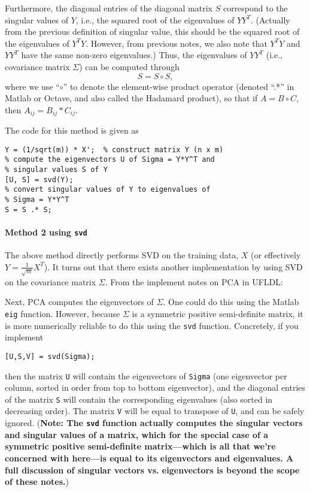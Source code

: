 \documentclass{article}
\begin{document}
Furthermore, the diagonal entries of the diagonal matrix $S$ correspond to the singular values of $Y$, i.e., the squared root of the eigenvalues of $YY^T$. (Actually from the previous definition of singular value, this should be the squared root of the eigenvalues of $Y^TY$. However, from previous notes, we also note that $Y^TY$ and $YY^T$ have the same non-zero eigenvalues.) Thus, the eigenvalues of $YY^T$ (i.e., covariance matrix $\Sigma$) can be computed through
\[
S = S\circ S,
\]
where we use ``$\circ$'' to denote the element-wise product operator (denoted ``.*'' in Matlab or Octave, and also called the Hadamard product), so that if $A=B\circ C$, then $A_{ij}=B_{ij}*C_{ij}$.

The code for this method is given as
\begin{verbatim}
Y = (1/sqrt(m)) * X';  % construct matrix Y (n x m)
% compute the eigenvectors U of Sigma = Y*Y^T and
% singular values S of Y
[U, S] = svd(Y);
% convert singular values of Y to eigenvalues of
% Sigma = Y*Y^T
S = S .* S;
\end{verbatim}

\paragraph{Method 2 using \texttt{svd}} The above method directly performs SVD on the training data, $X$ (or effectively $Y=\frac{1}{\sqrt{m}}X^T$). It turns out that there exists another implementation by using SVD on the covariance matrix $\Sigma$. From the implement notes on PCA in UFLDL:
\begin{shaded}
Next, PCA computes the eigenvectors of $\Sigma$. One could do this using the Matlab \texttt{eig} function. However, because $\Sigma$ is a symmetric positive semi-definite matrix, it is more numerically reliable to do this using the \texttt{svd} function. Concretely, if you implement
\begin{verbatim}
[U,S,V] = svd(Sigma);
\end{verbatim}
then the matrix \texttt{U} will contain the eigenvectors of \texttt{Sigma} (one eigenvector per column, sorted in order from top to bottom eigenvector), and the diagonal entries of the matrix \texttt{S} will contain the corresponding eigenvalues (also sorted in decreasing order). The matrix \texttt{V} will be equal to transpose of \texttt{U}, and can be safely ignored.
(\textbf{Note: The \texttt{svd} function actually computes the singular vectors and singular values of a matrix, which for the special case of a symmetric positive semi-definite matrix---which is all that we're concerned with here---is equal to its eigenvectors and eigenvalues. A full discussion of singular vectors vs. eigenvectors is beyond the scope of these notes.})
\end{shaded}
\end{document}
